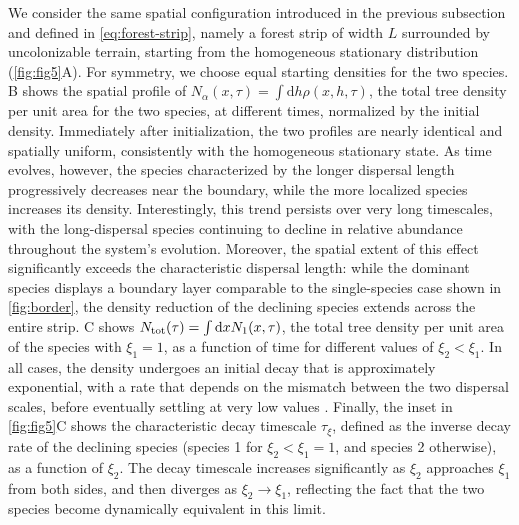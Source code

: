 \documentclass[aps,pre,twocolumn,superscriptaddress,10pt]{revtex4-2}
\begin{document}
We consider the same spatial configuration introduced in the previous subsection and defined in \cref{eq:forest-strip}, namely a forest strip of width $L$ surrounded by uncolonizable terrain, starting from the homogeneous stationary distribution (\cref{fig:fig5}A). For symmetry, we choose equal starting densities for the two species.
B shows the spatial profile of $N_\alpha(x, \tau)=\int \mathrm dh\rho(x,h,\tau)$, the total tree density per unit area for the two species, at different times, normalized by the initial density. Immediately after initialization, the two profiles are nearly identical and spatially uniform, consistently with the homogeneous stationary state. As time evolves, however, the species characterized by the longer dispersal length progressively decreases near the boundary, while the more localized species increases its density.
Interestingly, this trend persists over very long timescales, with the long-dispersal species continuing to decline in relative abundance throughout the system's evolution. Moreover, the spatial extent of this effect significantly exceeds the characteristic dispersal length: while the dominant species displays a boundary layer comparable to the single-species case shown in \cref{fig:border}, the density reduction of the declining species extends across the entire strip.
C shows $N_{\rm tot}(\tau)=\int\mathrm d x N_1(x,\tau)$, the total tree density per unit area of the species with $\xi_1=1$,  as a function of time for different values of $\xi_2<\xi_1$. In all cases, the density undergoes an initial decay that is approximately exponential, with a rate that depends on the mismatch between the two dispersal scales, before eventually settling at very low values \SInoref.
Finally, the inset in \cref{fig:fig5}C shows the characteristic decay timescale $\tau_\xi$, defined as the inverse decay rate of the declining species (species 1 for $\xi_2<\xi_1=1$, and species 2 otherwise), as a function of $\xi_2$.
The decay timescale increases significantly as $\xi_2$ approaches $\xi_1$ from both sides, and then diverges as $\xi_2\to\xi_1$, reflecting the fact that the two species become dynamically equivalent in this limit.
\end{document}
